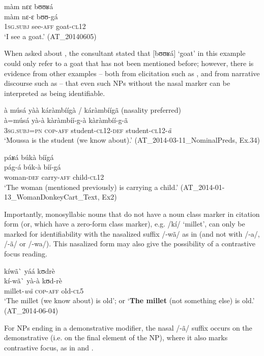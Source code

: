 \documentclass[output=paper]{langsci/langscibook}
\begin{document}
\ea\label{ex:teo:49}
màm nɛɛ bʊʊʁá\\
\gll màm nɛ-ɛ bʊʊ-gá\\
\textsc{1sg.subj} see-\textsc{aff} goat-\textsc{cl12}\\
\glt ‘I see a goat.’ (AT\_20140605)
\z

When asked about , the consultant stated that [bʊʊʁá] ‘goat’ in this example could only refer to a goat that has not been mentioned before; however, there is evidence from other examples – both from elicitation such as , and from narrative discourse such as  – that even such NPs without the nasal marker can be interpreted as being identifiable.

\ea\label{ex:teo:50}
à músá yàà káràmbíígà / káràmbíígã (nasality preferred)\\
\gll à=músá yà-à kàràmbíí-g-à kàràmbíí-g-ã\\
\textsc{3sg.subj=pn} \textsc{cop-aff} student-\textsc{cl12-def} student-\textsc{cl12}-\textit{ã}\\
\glt ‘Moussa is the student (we know about).’ (AT\_2014-03-11\_NominalPreds, Ex.34)
\z

\ea\label{ex:teo:51}
páʁá búkà bíígá\\
\gll pág-á búk-à bíí-gá\\
woman-\textsc{def} carry-\textsc{aff} child-\textsc{cl12}\\
\glt ‘The woman (mentioned previously) is carrying a child.’ (AT\_2014-01-13\_WomanDonkeyCart\_Text, Ex2)
\z

Importantly, monosyllabic nouns that do not have a noun class marker in citation form (or, which have a zero-form class marker), e.g. /kí/ ‘millet’, can only be marked for identifiability with the nasalized suffix /-wã/ as in  (and not with /-a/, /-ã/ or /-wa/). This nasalized form may also give the possibility of a contrastive focus reading.

\ea\label{ex:teo:52}
kíwã\`{}  yáá kʊdrè\\
\gll kí-wã\`{}  yà-à kʊd-rè\\
millet-\textit{wã} \textsc{cop-aff} old-\textsc{cl5}\\
\glt ‘The millet (we know about) is old’; or ‘\textbf{The millet} (not something else) is old.’ (AT\_2014-06-04)
\z

For NPs ending in a demonstrative modifier, the nasal /-ã/ suffix occurs on the demonstrative (i.e. on the final element of the NP), where it also marks contrastive focus, as in  and .
\end{document}
